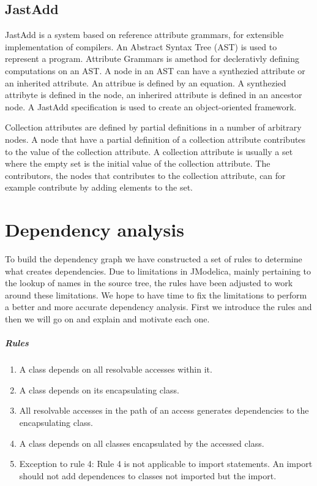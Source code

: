 \documentclass{cslthse-msc}
\begin{document}
\section{JastAdd}
JastAdd is a system based on reference attribute grammars, for extensible implementation of compilers. An Abstract Syntax Tree (AST) is used to represent a program. Attribute Grammars is amethod for declerativly defining computations on an AST. A node in an AST can have a synthezied attribute or an inherited attribute. An attribue is defined by an equation. A synthezied attribyte is defined in the node, an inherired attribute is defined in an ancestor node. A JastAdd specification is used to create an object-oriented framework.~\cite{aakesson2008development}

Collection attributes are defined by partial definitions in a number of arbitrary nodes. A node that have a partial definition of a collection attribute contributes to the value of the collection attribute. A collection attribute is usually a set where the empty set is the initial value of the collection attribute. The contributors, the nodes that contributes to the collection attribute, can for example contribute by adding elements to the set.~\cite{magnusson2007extending}

\chapter[Dependency analysis]{Dependency analysis}

To build the dependency graph we have constructed a set of rules to determine what creates dependencies. Due to limitations in JModelica, mainly pertaining to the lookup of names in the source tree, the rules have been adjusted to work around these limitations. We hope to have time to fix the limitations to perform a better and more accurate dependency analysis. First we introduce the rules and then we will go on and explain and motivate each one.

\paragraph{Rules}
\begin{enumerate}
\item A class depends on all resolvable accesses within it.
\item A class depends on its encapsulating class. 
\item All resolvable accesses in the path of an access generates dependencies to the encapsulating class.
\item A class depends on all classes encapsulated by the accessed class.
\item Exception to rule 4: Rule 4 is not applicable to import statements. An import should not add dependences to classes not imported but the import.
\end{enumerate}
\end{document}
